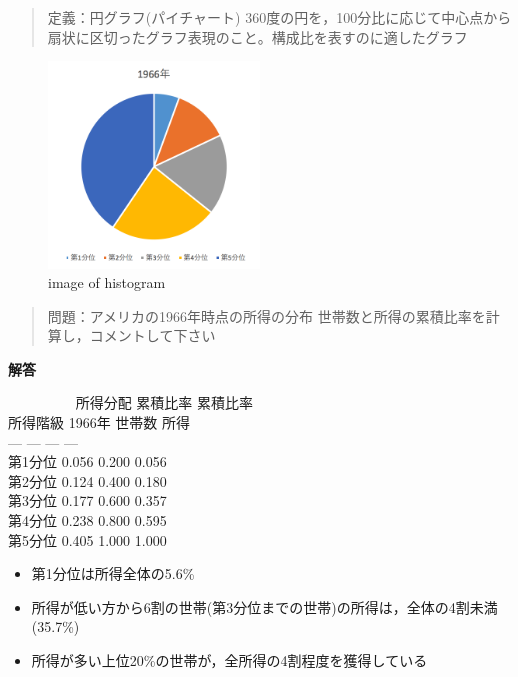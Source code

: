 \documentclass[
]{book}
\providecommand{\tightlist}{%
  \setlength{\itemsep}{0pt}\setlength{\parskip}{0pt}}
\theoremstyle{definition}
\theoremstyle{definition}
\theoremstyle{definition}
\theoremstyle{definition}
\theoremstyle{remark}
\begin{document}
\begin{quote}
定義：円グラフ(パイチャート)
360度の円を，100分比に応じて中心点から扇状に区切ったグラフ表現のこと。構成比を表すのに適したグラフ
\end{quote}

\begin{figure}
\centering
\includegraphics[width=0.5\textwidth,height=\textheight]{images/lec03/fig_us_income_dist1966.png}
\caption{image of histogram}
\end{figure}

\begin{quote}
問題：アメリカの1966年時点の所得の分布
世帯数と所得の累積比率を計算し，コメントして下さい
\end{quote}

\textbf{解答}

~~~~~~~~~\textbar{} 所得分配 \textbar{} 累積比率 \textbar{} 累積比率 \textbar{}\\
所得階級 \textbar{} 1966年 \textbar{} 世帯数 \textbar{} 所得 \textbar{}\\
--- \textbar{} --- \textbar{} --- \textbar{} --- \textbar{}\\
第1分位 \textbar{} 0.056 \textbar{} 0.200 \textbar{} 0.056 \textbar{}\\
第2分位 \textbar{} 0.124 \textbar{} 0.400 \textbar{} 0.180 \textbar{}\\
第3分位 \textbar{} 0.177 \textbar{} 0.600 \textbar{} 0.357 \textbar{}\\
第4分位 \textbar{} 0.238 \textbar{} 0.800 \textbar{} 0.595 \textbar{}\\
第5分位 \textbar{} 0.405 \textbar{} 1.000 \textbar{} 1.000 \textbar{}

\begin{itemize}
\tightlist
\item
  第1分位は所得全体の5.6\%
\item
  所得が低い方から6割の世帯(第3分位までの世帯)の所得は，全体の4割未満(35.7\%)
\item
  所得が多い上位20\%の世帯が，全所得の4割程度を獲得している
\end{itemize}
\end{document}
